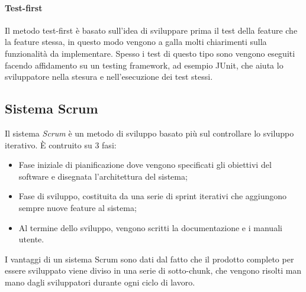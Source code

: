 \documentclass[a4paper, 10pt]{article}
\begin{document}
		\paragraph{Test-first} Il metodo test-first è basato sull'idea di sviluppare prima il test della feature che la feature stessa, in questo modo vengono a galla molti chiarimenti sulla funzionalità da implementare. Spesso i test di questo tipo sono vengono eseguiti facendo affidamento su un testing framework, ad esempio JUnit, che aiuta lo sviluppatore nella stesura e nell'esecuzione dei test stessi.
		
	\subsection{Sistema Scrum}
		Il sistema \textit{Scrum} è un metodo di sviluppo basato più sul controllare lo sviluppo iterativo. È contruito su 3 fasi:
		\begin{itemize}
			\item Fase iniziale di pianificazione dove vengono specificati gli obiettivi del software e disegnata l'architettura del sistema;
			\item Fase di sviluppo, costituita da una serie di sprint iterativi che aggiungono sempre nuove feature al sistema;
			
			\item Al termine dello sviluppo, vengono scritti la documentazione e i manuali utente.
		\end{itemize}
		I vantaggi di un sistema Scrum sono dati dal fatto che il prodotto completo per essere sviluppato viene diviso in una serie di sotto-chunk, che vengono risolti man mano dagli sviluppatori durante ogni ciclo di lavoro.
		
\end{document}
